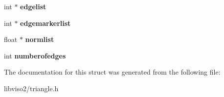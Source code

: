 \begin{DoxyCompactItemize}
\item 
\hypertarget{structtriangulateio_af8374f90431a318b694bb5424814f111}{int $\ast$ {\bfseries edgelist}}\label{structtriangulateio_af8374f90431a318b694bb5424814f111}

\item 
\hypertarget{structtriangulateio_a3f9be953734099d409f54736c3cd72af}{int $\ast$ {\bfseries edgemarkerlist}}\label{structtriangulateio_a3f9be953734099d409f54736c3cd72af}

\item 
\hypertarget{structtriangulateio_ad47e80dd7941e0693335c9a512746b38}{float $\ast$ {\bfseries normlist}}\label{structtriangulateio_ad47e80dd7941e0693335c9a512746b38}

\item 
\hypertarget{structtriangulateio_ac8c1b394861ed4a5c021a2d08a36a2a9}{int {\bfseries numberofedges}}\label{structtriangulateio_ac8c1b394861ed4a5c021a2d08a36a2a9}

\end{DoxyCompactItemize}


The documentation for this struct was generated from the following file\+:\begin{DoxyCompactItemize}
\item 
libviso2/triangle.\+h\end{DoxyCompactItemize}

